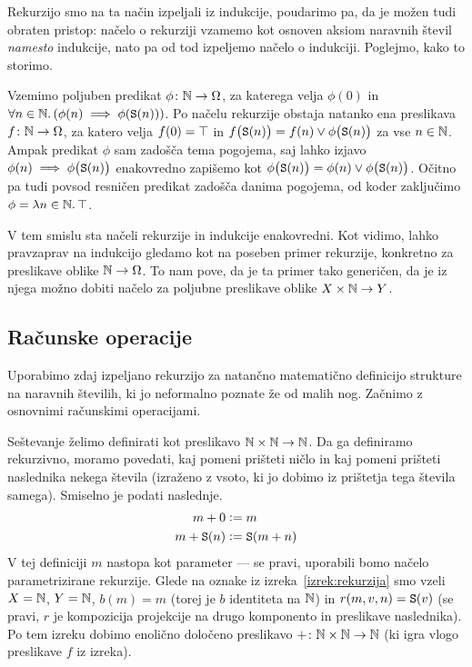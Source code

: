 Rekurzijo smo na ta način izpeljali iz indukcije, poudarimo pa, da je možen tudi obraten pristop: načelo o rekurziji vzamemo kot osnoven aksiom naravnih števil \emph{namesto} indukcije, nato pa od tod izpeljemo načelo o indukciji. Poglejmo, kako to storimo.

Vzemimo poljuben predikat $\phi\colon \mathbb{N} \to \Omega$, za katerega velja $\phi(0)$ in $\forall n \in \mathbb{N} .\, (\phi(n) \implies \phi(\mathtt{S}(n)))$. Po načelu rekurzije obstaja natanko ena preslikava $f\colon \mathbb{N} \to \Omega$, za katero velja $f(0) = \top$ in $f\big(\mathtt{S}(n)\big) = f(n) \lor \phi\big(\mathtt{S}(n)\big)$ za vse $n \in \mathbb{N}$. Ampak predikat $\phi$ sam zadošča tema pogojema, saj lahko izjavo $\phi(n) \implies \phi\big(\mathtt{S}(n)\big)$ enakovredno zapišemo kot $\phi\big(\mathtt{S}(n)\big) = \phi(n) \lor \phi\big(\mathtt{S}(n)\big)$. Očitno pa tudi povsod resničen predikat zadošča danima pogojema, od koder zaključimo $\phi = \lambda n \in \mathbb{N} .\,{\top}$.

V tem smislu sta načeli rekurzije in indukcije enakovredni. Kot vidimo, lahko pravzaprav na indukcijo gledamo kot na poseben primer rekurzije, konkretno za preslikave oblike $\mathbb{N} \to \Omega$. To nam pove, da je ta primer tako generičen, da je iz njega možno dobiti načelo za poljubne preslikave oblike $X \times \mathbb{N} \to Y$.


\subsection{Računske operacije}\label{podrazdelek:racunske_operacije_na_naravnih_stevilih}

Uporabimo zdaj izpeljano rekurzijo za natančno matematično definicijo strukture na naravnih številih, ki jo neformalno poznate že od malih nog. Začnimo z osnovnimi računskimi operacijami.

Seštevanje želimo definirati kot preslikavo $\mathbb{N} \times \mathbb{N} \to \mathbb{N}$. Da ga definiramo rekurzivno, moramo povedati, kaj pomeni prišteti ničlo in kaj pomeni prišteti naslednika nekega števila (izraženo z vsoto, ki jo dobimo iz prištetja tega števila samega). Smiselno je podati naslednje.
\begin{align*}
m + 0 &\mathrel{\mathop:}= m \\
m + \mathtt{S}(n) &\mathrel{\mathop:}= \mathtt{S}(m + n)
\end{align*}
V tej definiciji $m$ nastopa kot parameter --- se pravi, uporabili bomo načelo parametrizirane rekurzije. Glede na oznake iz izreka~\ref{izrek:rekurzija} smo vzeli $X = \mathbb{N}$, $Y = \mathbb{N}$, $b(m) = m$ (torej je $b$ identiteta na $\mathbb{N}$) in $r(m, v, n) = \mathtt{S}(v)$ (se pravi, $r$ je kompozicija projekcije na drugo komponento in preslikave naslednika). Po tem izreku dobimo enolično določeno preslikavo $+\colon \mathbb{N} \times \mathbb{N} \to \mathbb{N}$ (ki igra vlogo preslikave $f$ iz izreka).

